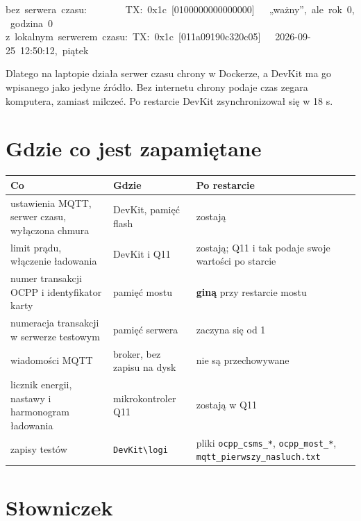 \documentclass[11pt,a4paper]{article}
\begin{document}
\begin{kodbox}
bez\ serwera\ czasu:\ \ \ \ \ \ \ \ TX:\ 0x1c\ [0100000000000000]\ \ \ „ważny”,\ ale\ rok\ 0,\ godzina\ 0\\
z\ lokalnym\ serwerem\ czasu:\ TX:\ 0x1c\ [011a09190c320c05]\ \ \ 2026-09-25\ 12:50:12,\ piątek
\end{kodbox}

Dlatego na laptopie działa serwer czasu chrony w Dockerze, a DevKit ma go wpisanego jako jedyne źródło. Bez internetu chrony podaje czas zegara komputera, zamiast milczeć. Po restarcie DevKit zsynchronizował się w 18 s.


\section{Gdzie co jest zapamiętane}

\begin{longtable}{>{\raggedright\arraybackslash}p{6.42cm}>{\raggedright\arraybackslash}p{3.21cm}>{\raggedright\arraybackslash}p{5.65cm}}
\toprule
\rowcolor{apteallight}\textbf{Co} & \textbf{Gdzie} & \textbf{Po restarcie} \\
\midrule\endhead
\bottomrule\endfoot
ustawienia MQTT, serwer czasu, wyłączona chmura & DevKit, pamięć flash & zostają \\
limit prądu, włączenie ładowania & DevKit i Q11 & zostają; Q11 i tak podaje swoje wartości po starcie \\
numer transakcji OCPP i identyfikator karty & pamięć mostu & \textbf{giną} przy restarcie mostu \\
numeracja transakcji w serwerze testowym & pamięć serwera & zaczyna się od 1 \\
wiadomości MQTT & broker, bez zapisu na dysk & nie są przechowywane \\
licznik energii, nastawy i harmonogram ładowania & mikrokontroler Q11 & zostają w Q11 \\
zapisy testów & \texttt{DevKit\textbackslash{}logi} & pliki \texttt{ocpp\_csms\_*}, \texttt{ocpp\_most\_*}, \texttt{mqtt\_\allowbreak{}pierwszy\_\allowbreak{}nasluch.\allowbreak{}txt} \\
\end{longtable}

\section*{Słowniczek}
\end{document}
